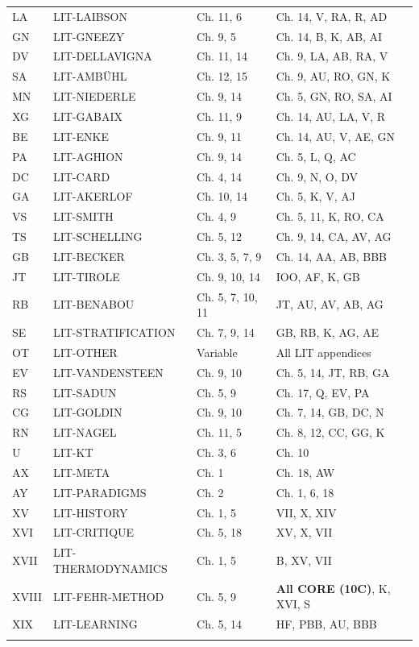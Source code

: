 \begin{longtable}{@{}llll@{}}
LA & LIT-LAIBSON & Ch. 11, 6 & Ch. 14, V, RA, R, AD \\
GN & LIT-GNEEZY & Ch. 9, 5 & Ch. 14, B, K, AB, AI \\
DV & LIT-DELLAVIGNA & Ch. 11, 14 & Ch. 9, LA, AB, RA, V \\
SA & LIT-AMBÜHL & Ch. 12, 15 & Ch. 9, AU, RO, GN, K \\
MN & LIT-NIEDERLE & Ch. 9, 14 & Ch. 5, GN, RO, SA, AI \\
XG & LIT-GABAIX & Ch. 11, 9 & Ch. 14, AU, LA, V, R \\
BE & LIT-ENKE & Ch. 9, 11 & Ch. 14, AU, V, AE, GN \\
PA & LIT-AGHION & Ch. 9, 14 & Ch. 5, L, Q, AC \\
DC & LIT-CARD & Ch. 4, 14 & Ch. 9, N, O, DV \\
GA & LIT-AKERLOF & Ch. 10, 14 & Ch. 5, K, V, AJ \\
VS & LIT-SMITH & Ch. 4, 9 & Ch. 5, 11, K, RO, CA \\
TS & LIT-SCHELLING & Ch. 5, 12 & Ch. 9, 14, CA, AV, AG \\
GB & LIT-BECKER & Ch. 3, 5, 7, 9 & Ch. 14, AA, AB, BBB \\
JT & LIT-TIROLE & Ch. 9, 10, 14 & IOO, AF, K, GB \\
RB & LIT-BENABOU & Ch. 5, 7, 10, 11 & JT, AU, AV, AB, AG \\
SE & LIT-STRATIFICATION & Ch. 7, 9, 14 & GB, RB, K, AG, AE \\
OT & LIT-OTHER & Variable & All LIT appendices \\
EV & LIT-VANDENSTEEN & Ch. 9, 10 & Ch. 5, 14, JT, RB, GA \\
RS & LIT-SADUN & Ch. 5, 9 & Ch. 17, Q, EV, PA \\
CG & LIT-GOLDIN & Ch. 9, 10 & Ch. 7, 14, GB, DC, N \\
RN & LIT-NAGEL & Ch. 11, 5 & Ch. 8, 12, CC, GG, K \\
U & LIT-KT & Ch. 3, 6 & Ch. 10 \\
AX & LIT-META & Ch. 1 & Ch. 18, AW \\
AY & LIT-PARADIGMS & Ch. 2 & Ch. 1, 6, 18 \\
XV & LIT-HISTORY & Ch. 1, 5 & VII, X, XIV \\
XVI & LIT-CRITIQUE & Ch. 5, 18 & XV, X, VII \\
XVII & LIT-THERMODYNAMICS & Ch. 1, 5 & B, XV, VII \\
XVIII & LIT-FEHR-METHOD & Ch. 5, 9 & \textbf{All CORE (10C)}, K, XVI, S \\
XIX & LIT-LEARNING & Ch. 5, 14 & HF, PBB, AU, BBB \\
\addlinespace


\end{longtable}
